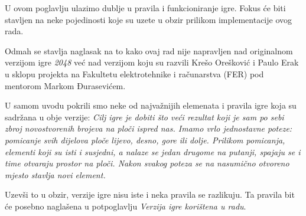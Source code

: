 \quad U ovom poglavlju ulazimo dublje u pravila i funkcioniranje igre. Fokus će biti stavljen na neke pojedinosti koje su uzete u obzir prilikom implementacije ovog rada.\par 
Odmah se stavlja naglasak na to kako ovaj rad nije napravljen nad originalnom verzijom igre \textit{2048} već nad verzijom koju su razvili Krešo Orešković i Paulo Erak u sklopu projekta na Fakultetu elektrotehnike i računarstva (FER) pod mentorom Markom Đurasevićem. \par
U samom uvodu pokrili smo neke od najvažnijih elemenata i pravila igre koja su sadržana u obje verzije: \textit{Cilj igre je dobiti što veći rezultat koji je sam po sebi zbroj novostvorenih brojeva na ploči ispred nas. Imamo vrlo jednostavne poteze: pomicanje svih dijelova ploče lijevo, desno, gore ili dolje. Prilikom pomicanja, elementi koji su isti i susjedni, a nalaze se jedan drugome na putanji, spajaju se i time otvaraju prostor na ploči. Nakon svakog poteza se na nasumično otvoreno mjesto stavlja novi element.}\par
 Uzevši to u obzir, verzije igre nisu iste i neka pravila se razlikuju. Ta pravila bit će posebno naglašena u potpoglavlju \textit{Verzija igre korištena u radu}.\par 


